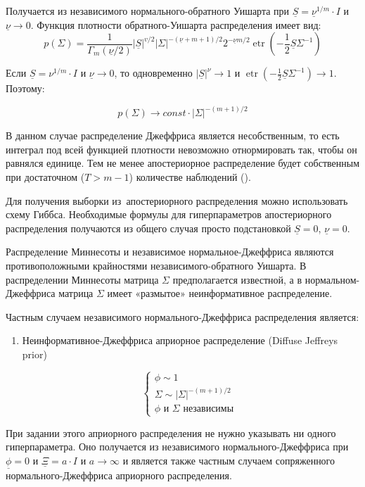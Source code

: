 \documentclass[11pt]{article} %
\DeclareMathOperator{\etr}{etr}
\newcommand{\prior}{\underline}
\begin{document}
\begin{enumerate}
\begin{enumerate}
Получается из независимого нормального-обратного Уишарта при $\prior S
= \prior \nu^{1/m} \cdot I$ и  $\prior \nu \to 0$. Функция плотности обратного-Уишарта распределения имеет вид:
\[
p(\Sigma) = \frac{1}{\Gamma_m(\prior\nu/2)}
|\prior S|^{v/2} |\Sigma|^{-(\prior\nu+m+1)/2}2^{-\prior\nu m/2}
\etr\left( -\frac{1}{2} \prior S\Sigma^{-1} \right)
\]

Если $\prior S= \nu^{1/m} \cdot I$ и $\prior \nu \to 0$, то одновременно $|\prior S|^{\nu} \to 1$ и $\etr\left( -\frac{1}{2} \prior S\Sigma^{-1} \right) \to 1$. Поэтому:

\[
p(\Sigma) \to const \cdot |\Sigma|^{-(m+1)/2}
\]


В данном случае распределение Джеффриса является несобственным, то есть интеграл под всей функцией плотности невозможно отнормировать так, чтобы он равнялся единице. Тем не менее апостериорное распределение будет собственным при достаточном ($T>m-1$) количестве наблюдений  (\cite{alvarez_2014}).


Для получения выборки из~апостериорного распределения можно
использовать схему Гиббса. Необходимые формулы для гиперпараметров
апостериорного распределения получаются из общего случая просто
подстановкой $\prior S=0$, $\prior \nu =0$.

Распределение Миннесоты и независимое нормальное-Джеффриса являются
противоположными крайностями независимого-обратного Уишарта. В
распределении Миннесоты матрица $\Sigma$ предполагается известной, а в
нормальном-Джеффриса матрица $\Sigma$ имеет «размытое» неинформативное
распределение.



Частным случаем независимого нормального-Джеффриса распределения является:


\begin{enumerate}

\item Неинформативное-Джеффриса априорное распределение (Diffuse Jeffreys prior)

\begin{equation}
\begin{cases}
\phi \sim 1 \\
\Sigma \sim |\Sigma|^{-(m+1)/2} \\
\phi \text{ и } \Sigma \text{ независимы }
\end{cases}
\end{equation}

\end{enumerate}

При задании этого априорного распределения не нужно указывать ни одного
гиперпараметра. Оно получается из независимого нормального-Джеффриса при $\prior\phi=0$ и $\prior\Xi= a\cdot I$ и $a\to \infty$ и является также частным случаем сопряженного нормального-Джеффриса априорного распределения.



\end{enumerate}
\end{enumerate}
\end{document}
